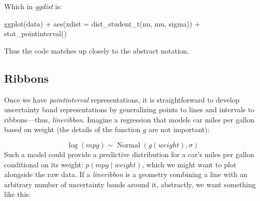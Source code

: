 \documentclass[journal]{vgtc}                     %
\newenvironment{centerverbatim}{%
  \hfill\break
  \small
  \centering
  \varwidth{\linewidth}%
  \verbatim
}{%
  \endverbatim
  \endvarwidth
  \par
  \hfill\break
}
\begin{document}
Which in \textit{ggdist} is:

\begin{centerverbatim}
ggplot(data) +
  aes(xdist = dist_student_t(nu, mu, sigma)) +
  stat_pointinterval()
\end{centerverbatim}

Thus the code matches up closely to the abstract notation.

\subsection{Ribbons}

Once we have \textit{pointinterval} representations, it is straightforward to develop uncertainty band representations by generalizing points to lines and intervals to ribbons---thus, \textit{lineribbon}. Imagine a regression that models car miles per gallon based on weight (the details of the function $g$ are not important):

\[
\log(\mathit{mpg}) \sim \operatorname{Normal}\left(g(\mathit{weight}), \sigma\right)
\]
Such a model could provide a predictive distribution for a car's miles per gallon conditional on its weight: $p(\mathit{mpg} \mid \mathit{weight})$, which we might want to plot alongside the raw data. If a \textit{lineribbon} is a geometry combining a line with an arbitrary number of uncertainty bands around it, abstractly, we want something like this:
\end{document}
